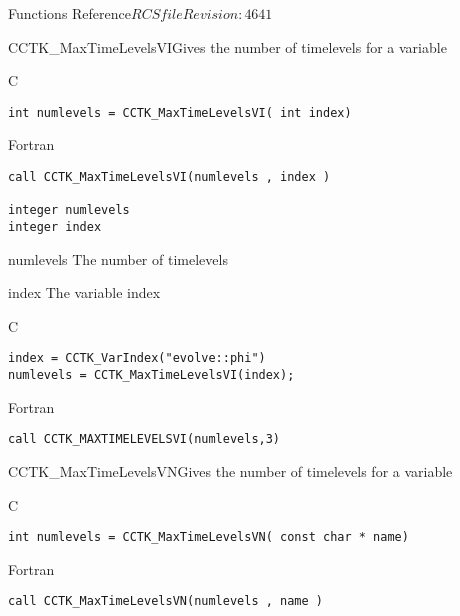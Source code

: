 \begin{cactuspart}{ Functions Reference}{$RCSfile$}{$Revision: 4641 $}
\begin{FunctionDescription}{CCTK\_MaxTimeLevelsVI}{Gives the number of timelevels for a variable}
\label{CCTK-MaxTimeLevelsVI}
\begin{SynopsisSection}
\begin{Synopsis}{C}
\begin{verbatim}int numlevels = CCTK_MaxTimeLevelsVI( int index)\end{verbatim}
\end{Synopsis}
\begin{Synopsis}{Fortran}
\begin{verbatim}call CCTK_MaxTimeLevelsVI(numlevels , index )

integer numlevels
integer index\end{verbatim}
\end{Synopsis}
\end{SynopsisSection}
\begin{ParameterSection}
\begin{Parameter}{numlevels}
The number of timelevels
\end{Parameter}
\begin{Parameter}{index}
The variable index
\end{Parameter}
\end{ParameterSection}

\begin{ExampleSection}
\begin{Example}{C}
\begin{verbatim}
index = CCTK_VarIndex("evolve::phi")
numlevels = CCTK_MaxTimeLevelsVI(index);
\end{verbatim}
\end{Example}
\begin{Example}{Fortran}
\begin{verbatim}
call CCTK_MAXTIMELEVELSVI(numlevels,3)
\end{verbatim}
\end{Example}
\end{ExampleSection}
\end{FunctionDescription}

\begin{FunctionDescription}{CCTK\_MaxTimeLevelsVN}{Gives the number of timelevels for a variable}
\label{CCTK-MaxTimeLevelsVN}
\begin{SynopsisSection}
\begin{Synopsis}{C}
\begin{verbatim}int numlevels = CCTK_MaxTimeLevelsVN( const char * name)\end{verbatim}
\end{Synopsis}
\begin{Synopsis}{Fortran}
\begin{verbatim}call CCTK_MaxTimeLevelsVN(numlevels , name )


\end{verbatim}
\end{Synopsis}
\end{SynopsisSection}
\end{FunctionDescription}
\end{cactuspart}
